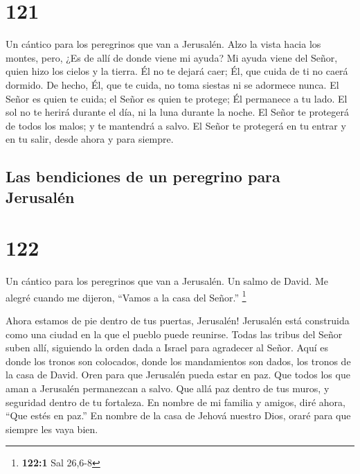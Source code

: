 \hypertarget{section-120}{%
\section{121}\label{section-120}}

Un cántico para los peregrinos que van a Jerusalén.  Alzo la
vista hacia los montes, pero, ¿Es de allí de donde viene mi ayuda?
 Mi ayuda viene del Señor, quien hizo los cielos y la
tierra.  Él no te dejará caer; Él, que cuida de ti no caerá
dormido.  De hecho, Él, que te cuida, no toma siestas ni se
adormece nunca.  El Señor es quien te cuida; el Señor es
quien te protege; Él permanece a tu lado.  El sol no te
herirá durante el día, ni la luna durante la noche.  El
Señor te protegerá de todos los malos; y te mantendrá a salvo.
 El Señor te protegerá en tu entrar y en tu salir, desde
ahora y para siempre.

\hypertarget{las-bendiciones-de-un-peregrino-para-jerusaluxe9n}{%
\subsection{Las bendiciones de un peregrino para
Jerusalén}\label{las-bendiciones-de-un-peregrino-para-jerusaluxe9n}}

\hypertarget{section-121}{%
\section{122}\label{section-121}}

Un cántico para los peregrinos que van a Jerusalén. Un salmo de David.
 Me alegré cuando me dijeron, ``Vamos a la casa del Señor.''
\footnote{\textbf{122:1} Sal 26,6-8}

 Ahora estamos de pie dentro de tus puertas, Jerusalén!
 Jerusalén está construida como una ciudad en la que el
pueblo puede reunirse.  Todas las tribus del Señor suben
allí, siguiendo la orden dada a Israel para agradecer al Señor.
 Aquí es donde los tronos son colocados, donde los
mandamientos son dados, los tronos de la casa de David. 
Oren para que Jerusalén pueda estar en paz. Que todos los que aman a
Jerusalén permanezcan a salvo.  Que allá paz dentro de tus
muros, y seguridad dentro de tu fortaleza.  En nombre de mi
familia y amigos, diré ahora, ``Que estés en paz.''  En
nombre de la casa de Jehová nuestro Dios, oraré para que siempre les
vaya bien.

